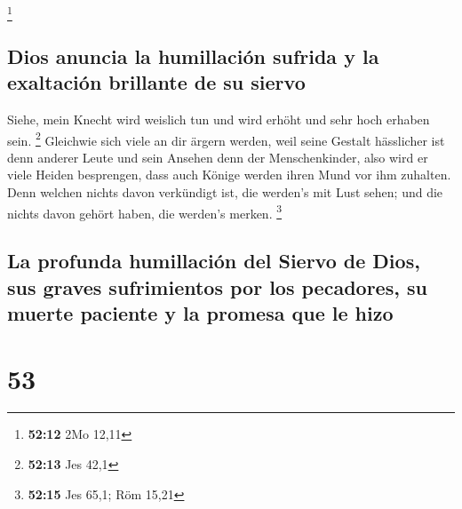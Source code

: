 \footnote{\textbf{52:12} 2Mo 12,11}

\hypertarget{dios-anuncia-la-humillaciuxf3n-sufrida-y-la-exaltaciuxf3n-brillante-de-su-siervo}{%
\subsection{Dios anuncia la humillación sufrida y la exaltación
brillante de su
siervo}\label{dios-anuncia-la-humillaciuxf3n-sufrida-y-la-exaltaciuxf3n-brillante-de-su-siervo}}

 Siehe, mein Knecht wird weislich tun und wird erhöht und
sehr hoch erhaben sein. \footnote{\textbf{52:13} Jes 42,1}
 Gleichwie sich viele an dir ärgern werden, weil seine
Gestalt hässlicher ist denn anderer Leute und sein Ansehen denn der
Menschenkinder,  also wird er viele Heiden besprengen,
dass auch Könige werden ihren Mund vor ihm zuhalten. Denn welchen nichts
davon verkündigt ist, die werden's mit Lust sehen; und die nichts davon
gehört haben, die werden's merken. \footnote{\textbf{52:15} Jes 65,1;
  Röm 15,21}

\hypertarget{la-profunda-humillaciuxf3n-del-siervo-de-dios-sus-graves-sufrimientos-por-los-pecadores-su-muerte-paciente-y-la-promesa-que-le-hizo}{%
\subsection{La profunda humillación del Siervo de Dios, sus graves
sufrimientos por los pecadores, su muerte paciente y la promesa que le
hizo}\label{la-profunda-humillaciuxf3n-del-siervo-de-dios-sus-graves-sufrimientos-por-los-pecadores-su-muerte-paciente-y-la-promesa-que-le-hizo}}

\hypertarget{section-52}{%
\section{53}\label{section-52}}

